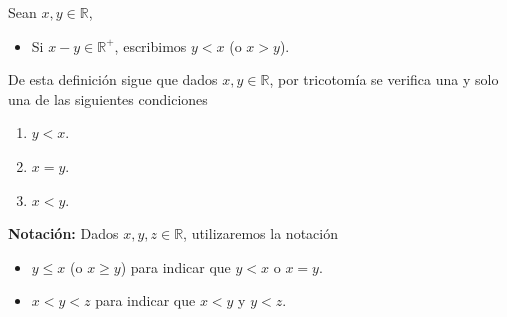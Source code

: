 \documentclass[11pt]{article}
\newcommand{\R}{\mathbb{R}}
\begin{document}
Sean $x,y\in \R$, \begin{itemize}
    \item Si $x-y\in \R^+$, escribimos $y<x$ (o $x>y$).
\end{itemize}

De esta definición sigue que dados $x,y\in \R$, por tricotomía se verifica una y solo una de las siguientes condiciones\vspace{-1em} \begin{enumerate}[label=\roman*)]
    \item $y<x$.
    \item $x=y$.
    \item $x<y$.
\end{enumerate}\vspace{-1em}

\textbf{Notación:} Dados $x,y,z\in \R$, utilizaremos la notación \begin{itemize}
    \item $y \leq x$ (o $x\geq y$) para indicar que $y<x$ o $x=y$.
    \item $x<y<z$ para indicar que $x<y$ y $y<z$.
\end{itemize}
%
\end{document}
